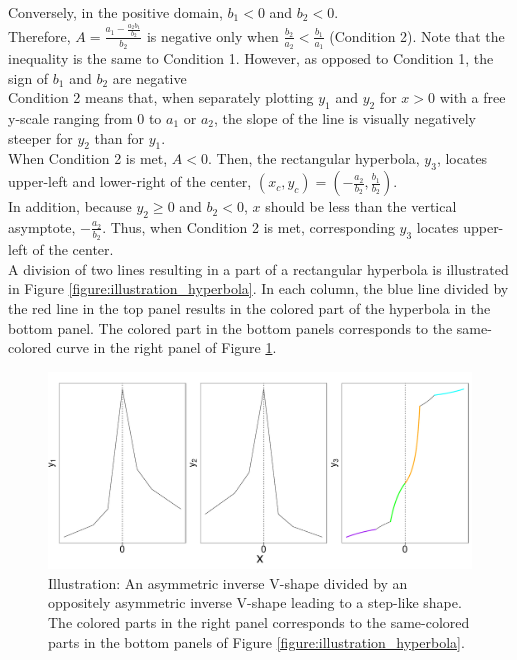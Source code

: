 \documentclass[11pt, a4paper]{article}
\begin{document}
\noindent
Conversely, in the positive domain, $b_1<0$ and $b_2<0$.\\
Therefore, $A = \frac{a_1-\frac{a_2 b_1}{b_2}}{b_2}$ is negative only when $\frac{b_2}{a_2} < \frac{b_1}{a_1}$ (Condition 2). Note that the inequality is the same to Condition 1. However, as opposed to Condition 1, the sign of $b_1$ and $b_2$ are negative\\
Condition 2 means that, when separately plotting $y_1$ and $y_2$ for $x>0$ with a free y-scale ranging from 0 to $a_1$ or $a_2$, the slope of the line is visually negatively steeper for $y_2$ than for $y_1$.\\

\noindent
When Condition 2 is met, $A<0$. Then, the rectangular hyperbola, $y_3$, locates upper-left and lower-right of the center, $(x_c, y_c) = (-\frac{a_2}{b_2}, \frac{b_1}{b_2})$.\\ 

\noindent
In addition, because $y_2 \geq 0$ and $b_2<0$, $x$ should be less than the vertical asymptote, $-\frac{a_2}{b_2}$. Thus, when Condition 2 is met, corresponding $y_3$ locates upper-left of the center. \\

\noindent
A division of two lines resulting in a part of a rectangular hyperbola is illustrated in Figure \ref{figure:illustration_hyperbola}. In each column, the blue line divided by the red line in the top panel results in the colored part of the hyperbola in the bottom panel. The colored part in the bottom panels corresponds to the same-colored curve in the right panel of Figure \ref{figure:illustration_color}.

\begin{figure}[H]
	\centering
	\includegraphics[width=0.9\columnwidth]{illustration_color.pdf}
	\caption{\small Illustration: An asymmetric inverse V-shape divided by an oppositely asymmetric inverse V-shape leading to a step-like shape. The colored parts in the right panel corresponds to the same-colored parts in the bottom panels of Figure \ref{figure:illustration_hyperbola}.}
	\label{figure:illustration_color}
\end{figure}
\end{document}
